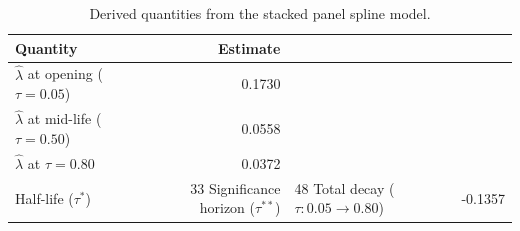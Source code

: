 \begin{table}[H]
\centering
\small
\caption{Derived quantities from the stacked panel spline model.}
\label{tab:derived}
\begin{tabular}{lr}
\toprule
Quantity & Estimate \\
\midrule
$\hat{\lambda}$ at opening ($\tau = 0.05$) & 0.1730 \\
$\hat{\lambda}$ at mid-life ($\tau = 0.50$) & 0.0558 \\
$\hat{\lambda}$ at $\tau = 0.80$ & 0.0372 \\
Half-life ($\tau^*$) & 33%
Significance horizon ($\tau^{**}$) & 48%
Total decay ($\tau: 0.05 \to 0.80$) & -0.1357 \\
\bottomrule
\end{tabular}
\end{table}